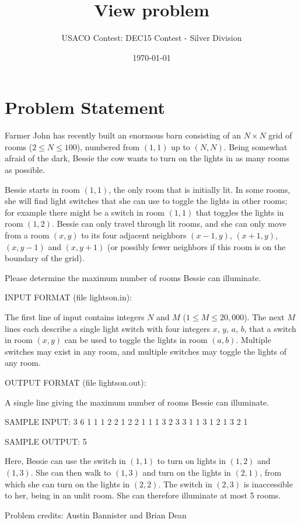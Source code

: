 \documentclass[12pt]{article}
\title{View problem}
\author{USACO Contest: DEC15 Contest - Silver Division}
\date{\today}
\begin{document}
\maketitle

\section*{Problem Statement}

Farmer John has recently built an enormous barn consisting of an $N \times N$
grid of rooms ($2 \leq N \leq 100$), numbered from $(1,1)$ up to $(N,N)$.  Being
somewhat afraid of the dark, Bessie the cow wants to turn on the lights in as
many rooms as possible.  

Bessie starts in room $(1,1)$, the only room that is initially lit.
In some rooms, she will find light switches that she can use to toggle
the lights in other rooms; for example there might be a switch in room
$(1,1)$ that toggles the lights in room $(1,2)$. Bessie can only
travel through lit rooms, and she can only move from a room $(x,y)$ to
its four adjacent neighbors $(x-1,y)$, $(x+1,y)$, $(x,y-1)$ and
$(x,y+1)$ (or possibly fewer neighbors if this room is on the boundary
of the grid).

Please determine the maximum number of rooms Bessie can illuminate.

INPUT FORMAT (file lightson.in):

The first line of input contains integers $N$ and $M$ ($1 \leq M \leq
20,000$).  The next $M$ lines each describe a single light switch
with four integers $x$, $y$, $a$, $b$, that a switch in room $(x,y)$
can be used to toggle the lights in room $(a,b)$.  Multiple switches
may exist in any room, and multiple switches may toggle the lights of
any room.


OUTPUT FORMAT (file
lightson.out):

A single line giving the maximum number of rooms Bessie can
illuminate.


SAMPLE INPUT: 
3 6
1 1 1 2
2 1 2 2
1 1 1 3
2 3 3 1
1 3 1 2
1 3 2 1

SAMPLE OUTPUT: 
5

Here, Bessie can use the switch in $(1,1)$ to turn on 
lights in $(1,2)$ and $(1,3)$. She can then walk to $(1,3)$ and turn on the lights in 
$(2,1)$, from which she can turn on the lights in $(2,2)$.  The switch in 
$(2,3)$ is inaccessible to her, being in an unlit room.  She can therefore 
illuminate at most 5 rooms. 

Problem credits: Austin Bannister and Brian Dean
\end{document}
